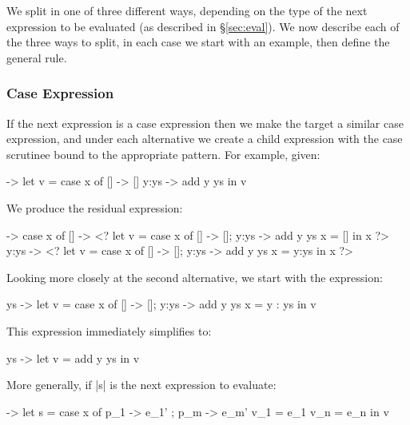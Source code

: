 \documentclass[draft]{sigplanconf}
\begin{document}
\smallskip
We split in one of three different ways, depending on the type of the next expression to be evaluated (as described in \S\ref{sec:eval}). We now describe each of the three ways to split, in each case we start with an example, then define the general rule.

\subsubsection{Case Expression}
\label{sec:eval_split_case}

If the next expression is a case expression then we make the target a similar case expression, and under each alternative we create a child expression with the case scrutinee bound to the appropriate pattern. For example, given:

\begin{code}
\x ->  let   v = case  x of
                       []    -> []
                       y:ys  -> add y ys
       in    v
\end{code}

We produce the residual expression:

\begin{code}
\x ->  case x of
       []    -> <?  let  v =  case x of [] -> []; y:ys -> add y ys
                         x =  []
                    in   x ?>
       y:ys  -> <?  let  v =  case x of [] -> []; y:ys -> add y ys
                         x =  y:ys
                    in   x ?>
\end{code}

Looking more closely at the second alternative, we start with the expression:

\begin{code}
\y ys ->  let  v  = case x of [] -> []; y:ys -> add y ys
               x  = y : ys
          in   v
\end{code}

This expression immediately simplifies to:

\begin{code}
\y ys ->  let  v = add y ys
          in   v
\end{code}

More generally, if |s| is the next expression to evaluate:

\begin{code}
\free ->  let  s    = case x of p_1 -> e_1' ; p_m -> e_m'
               v_1  = e_1
               v_n  = e_n
          in   v
\end{code}
\end{document}
